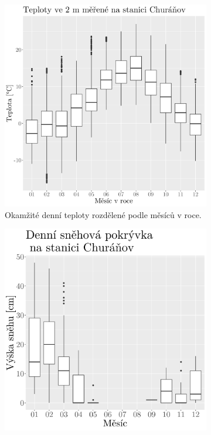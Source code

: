 \begin{figure}
	\centering
	\begin{subfigure}{0.45\textwidth}
  \includegraphics[width=\textwidth]{img/synop_temperature.png}
		\caption{Okamžité denní teploty rozdělené podle měsíců v roce.}
		\label{fig:synop_temperature}
	\end{subfigure}
	\hfill
	\begin{subfigure}{0.45\textwidth}
  \includegraphics[width=\textwidth]{img/ch2/hist_snow_synop_bymonth.png}

\end{subfigure}
\end{figure}
